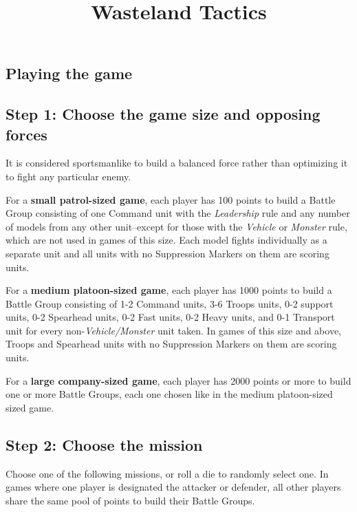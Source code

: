








\title{Wasteland Tactics}

\begin{titlepage}
\maketitle
\end{titlepage}

\begin{multicols}{2}

\chapter*{Playing the game}

\section*{Step 1: Choose the game size and opposing forces}
It is considered sportsmanlike to build a balanced force rather than optimizing it to fight any particular enemy.

For a \textbf{small patrol-sized game}, each player has 100 points to build a Battle Group consisting of one Command unit with the \textit{Leadership} rule and any number of models from any other unit--except for those with the \textit{Vehicle} or \textit{Monster} rule, which are not used in games of this size. Each model fights individually as a separate unit and all units with no Suppression Markers on them are scoring units.

For a \textbf{medium platoon-sized game}, each player has 1000 points to build a Battle Group consisting of 1-2 Command units, 3-6 Troops units, 0-2 support units, 0-2 Spearhead units, 0-2 Fast units, 0-2 Heavy units, and 0-1 Transport unit for every non-\textit{Vehicle/Monster} unit taken. In games of this size and above, Troops and Spearhead units with no Suppression Markers on them are scoring units.

For a \textbf{large company-sized game}, each player has 2000 points or more to build one or more Battle Groups, each one chosen like in the medium platoon-sized sized game.




\section*{Step 2: Choose the mission}
Choose one of the following missions, or roll a die to randomly select one. In games where one player is designated the attacker or defender, all other players share the same pool of points to build their Battle Groups.


\end{multicols}
